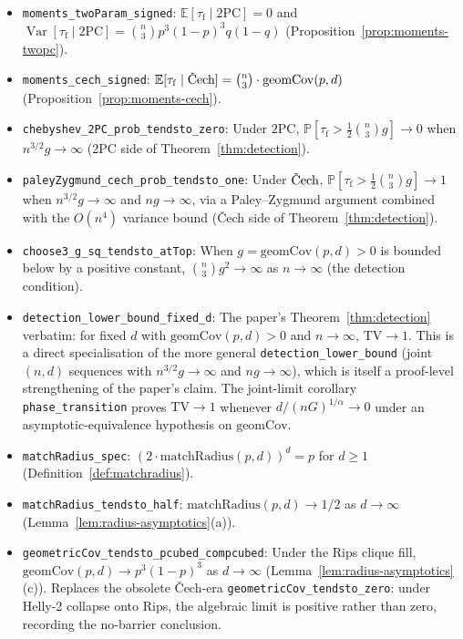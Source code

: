 \documentclass[reqno,12pt]{amsart}
\newcommand{\tauf}{\tau_{\mathrm{f}}}
\newcommand{\PC}{\mathrm{2PC}}
\newcommand{\Cech}{\ifmmode\text{\v{C}ech}\else\v{C}ech\fi}  %
\newcommand{\TV}{\mathrm{TV}}
\newcommand{\geomCov}{\mathrm{geomCov}}
\newcommand{\matchR}{\mathrm{matchRadius}}
\newcommand{\EE}{\mathbb{E}}
\newcommand{\PP}{\mathbb{P}}
\DeclareMathOperator{\Var}{Var}
\newcommand{\lean}[1]{\textup{\texttt{\small #1}}}
\theoremstyle{plain}
\theoremstyle{definition}
\theoremstyle{remark}
\begin{document}
\begin{itemize}[leftmargin=*, itemsep=4pt]
\item \lean{moments\_twoParam\_signed}: $\EE[\tauf\mid\PC] = 0$ and
  $\Var[\tauf\mid\PC] = \binom{n}{3}p^3(1-p)^3 q(1-q)$
  (Proposition~\ref{prop:moments-twopc}).

\item \lean{moments\_cech\_signed}: $\EE[\tauf\mid\Cech] = \binom{n}{3}\cdot\geomCov(p,d)$
  (Proposition~\ref{prop:moments-cech}).

\item \lean{chebyshev\_2PC\_prob\_tendsto\_zero}: Under $\PC$,
  $\PP[\tauf > \frac{1}{2}\binom{n}{3}g]\to 0$ when $n^{3/2}g\to\infty$
  (2PC side of Theorem~\ref{thm:detection}).

\item \lean{paleyZygmund\_cech\_prob\_tendsto\_one}: Under $\Cech$,
  $\PP[\tauf > \frac{1}{2}\binom{n}{3}g]\to 1$ when $n^{3/2} g \to \infty$ and
  $n g \to \infty$, via a Paley--Zygmund argument combined with the $O(n^4)$ variance
  bound (\v{C}ech side of Theorem~\ref{thm:detection}).

\item \lean{choose3\_g\_sq\_tendsto\_atTop}: When $g = \geomCov(p,d) > 0$ is bounded
  below by a positive constant, $\binom{n}{3} g^2 \to \infty$ as $n \to \infty$
  (the detection condition).

\item \lean{detection\_lower\_bound\_fixed\_d}: The paper's Theorem~\ref{thm:detection}
  verbatim: for fixed $d$ with $\geomCov(p,d)>0$ and $n\to\infty$, $\TV\to 1$.
  This is a direct specialisation of the more general
  \lean{detection\_lower\_bound} (joint $(n,d)$ sequences with
  $n^{3/2}g\to\infty$ and $n g\to\infty$), which is itself a proof-level
  strengthening of the paper's claim. The joint-limit corollary
  \lean{phase\_transition} proves $\TV\to 1$ whenever
  $d/(nG)^{1/\alpha}\to 0$ under an asymptotic-equivalence hypothesis on
  $\geomCov$.

\item \lean{matchRadius\_spec}: $(2\cdot\matchR(p,d))^d = p$ for $d\geq 1$
  (Definition~\ref{def:matchradius}).

\item \lean{matchRadius\_tendsto\_half}: $\matchR(p,d)\to 1/2$ as $d\to\infty$
  (Lemma~\ref{lem:radius-asymptotics}(a)).

\item \lean{geometricCov\_tendsto\_pcubed\_compcubed}: Under the Rips clique fill,
  $\geomCov(p,d) \to p^3 (1-p)^3$ as $d \to \infty$
  (Lemma~\ref{lem:radius-asymptotics}(c)). Replaces the obsolete Čech-era
  \texttt{geometricCov\_tendsto\_zero}: under Helly-2 collapse onto Rips, the algebraic
  limit is positive rather than zero, recording the no-barrier conclusion.


\end{itemize}
\end{document}
